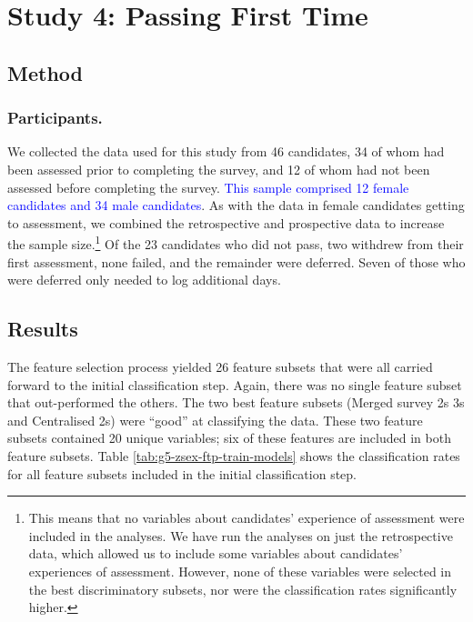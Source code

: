 \documentclass[
  12pt,
  a4paper,
]{book}
\begin{document}
\hypertarget{ftp}{%
\section{Study 4: Passing First Time}\label{ftp}}

\hypertarget{ftp-method}{%
\subsection{Method}\label{ftp-method}}

\hypertarget{ftp-participants}{%
\subsubsection{Participants.}\label{ftp-participants}}

We collected the data used for this study from 46 candidates, 34 of whom had been assessed prior to completing the survey, and 12 of whom had not been assessed before completing the survey. \textcolor{blue}{This sample comprised 12 female candidates and 34 male candidates}. As with the data in female candidates getting to assessment, we combined the retrospective and prospective data to increase the sample size.\footnote{This means that no variables about candidates' experience of assessment were included in the analyses. We have run the analyses on just the retrospective data, which allowed us to include some variables about candidates' experiences of assessment. However, none of these variables were selected in the best discriminatory subsets, nor were the classification rates significantly higher.} Of the 23 candidates who did not pass, two withdrew from their first assessment, none failed, and the remainder were deferred. Seven of those who were deferred only needed to log additional days.

\hypertarget{ftp-results}{%
\subsection{Results}\label{ftp-results}}

The feature selection process yielded 26 feature subsets that were all carried forward to the initial classification step. Again, there was no single feature subset that out-performed the others. The two best feature subsets (Merged survey 2s 3s and Centralised 2s) were ``good'' at classifying the data. These two feature subsets contained 20 unique variables; six of these features are included in both feature subsets. Table \ref{tab:g5-zsex-ftp-train-models} shows the classification rates for all feature subsets included in the initial classification step.
\end{document}
